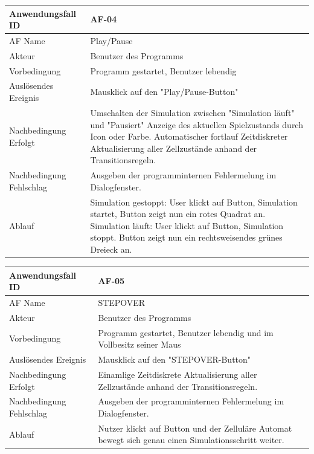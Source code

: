 \documentclass[11pt,a4paper]{article}
\begin{document}
\begin{tabular}[m]{|m{7cm}|m{9cm}|}
    \hline
    Anwendungsfall ID     & AF-04 \\
         \hline
    AF Name     &  Play/Pause \\
         \hline
    Akteur&Benutzer des Programms \\
    \hline
    Vorbedingung&Programm gestartet, Benutzer lebendig\\
    \hline
    Auslösendes Ereignis&Mausklick auf den "Play/Pause-Button"\\
    \hline
    Nachbedingung Erfolgt&Umschalten der Simulation zwischen "Simulation läuft" und "Pausiert" Anzeige des aktuellen Spielzustands durch Icon oder Farbe. Automatischer fortlauf Zeitdiskreter Aktualisierung aller Zellzustände anhand der Transitionsregeln.\\
    \hline
    Nachbedingung Fehlschlag&Ausgeben der programminternen Fehlermelung im Dialogfenster.\\
    \hline
    Ablauf&Simulation gestoppt: User klickt auf Button, Simulation startet, Button zeigt nun ein rotes Quadrat an. Simulation läuft: User klickt auf Button, Simulation stoppt. Button zeigt nun ein rechtsweisendes grünes Dreieck an.\\
    \hline
\end{tabular}
\par


\begin{tabular}[m]{|m{7cm}|m{9cm}|}
    \hline
    Anwendungsfall ID     & AF-05 \\
         \hline
    AF Name     &  STEPOVER \\
         \hline
    Akteur&Benutzer des Programms \\
    \hline
    Vorbedingung&Programm gestartet, Benutzer lebendig und im Vollbesitz seiner Maus\\
    \hline
    Auslösendes Ereignis&Mausklick auf den "STEPOVER-Button"\\
    \hline
    Nachbedingung Erfolgt& Einamlige Zeitdiskrete Aktualisierung aller Zellzustände anhand der Transitionsregeln.\\
    \hline
    Nachbedingung Fehlschlag&Ausgeben der programminternen Fehlermelung im Dialogfenster.\\
    \hline
    Ablauf&Nutzer klickt auf Button und der Zelluläre Automat bewegt sich genau einen Simulationsschritt weiter.\\
    \hline
\end{tabular}
\par
\end{document}

